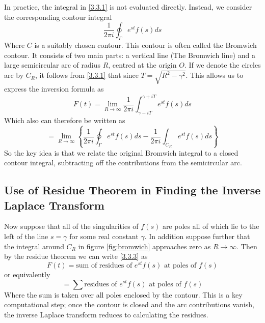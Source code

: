 In practice, the integral in \ref{3.3.1} is not evaluated directly. Instead, we consider the corresponding contour integral
\begin{equation}\label{3.3.2}
    \frac{1}{2\pi i}\oint_{\Gamma}e^{st}f(s)ds
\end{equation}
Where $C$ is a suitably chosen contour. This contour is often called the Bromwich contour. It consists of two main parts: a vertical line (The Bromwich line) and a large semicircular arc of radius $R$, centred at the origin $O$. If we denote the circles arc by $C_R$, it follows from \ref{3.3.1} that since $T=\sqrt{R^{2}-\gamma^{2}}$. This allows us to express the inversion formula as 
\begin{equation}\label{3.3.3}
    F(t)= \lim_{R\rightarrow\infty}\frac{1}{2\pi i}\int^{\gamma+iT}_{\gamma-iT}e^{st}f(s)ds 
\end{equation}
Which also can therefore be written as
$$=\lim_{R\rightarrow\infty}\left\{\frac{1}{2\pi i}\oint_{\Gamma}e^{st}f(s)ds-\frac{1}{2\pi i}\int_{C_R}e^{st}f(s)ds\right\}$$
So the key idea is that we relate the original Bromwich integral to a closed contour integral, subtracting off the contributions from the semicircular arc. \cite{TransformsTheory}

\subsection{Use of Residue Theorem in Finding the Inverse Laplace Transform}\label{4.1.2}
Now suppose that all of the singularities of $f(s)$ are poles all of which lie to the left of the line $s=\gamma$ for some real constant $\gamma$. In addition suppose further that the integral around $C_R$ in figure \ref{fig:bromwich} approaches zero as $R\rightarrow\infty$. Then by the residue theorem we can write \ref{3.3.3} as 
\begin{equation}\label{3.3.4}
    F(t)=\text{sum of residues of }e^{st}f(s) \text{ at poles of }f(s) 
\end{equation}
or equivalently
\begin{equation}
    =\sum\text{residues of }e^{st}f(s)\text{ at poles of }f(s)
\end{equation}
Where the sum is taken over all poles enclosed by the contour.
This is a key computational step; once the contour is closed and the arc contributions vanish, the inverse Laplace transform reduces to calculating the residues. \cite{RedBook,TransformsTheory}

